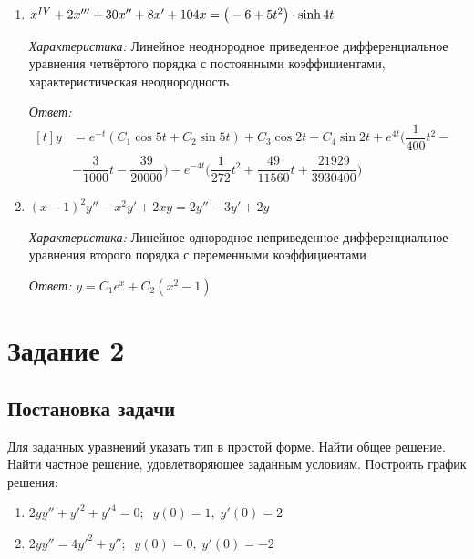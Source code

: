 \documentclass[a4paper, 14pt, fleqn]{extarticle}
\begin{document}
\begin{enumerate}
				\item \(x^{\MakeUppercase{\romannumeral 4}} + 2x''' + 30x'' + 8x' + 104x = \big(-6 + 5t^2\big) \cdot \sinh{4t} \)

					\textit{Характеристика:}  Линейное неоднородное приведенное дифференциальное уравнения четвёртого порядка с постоянными коэффициентами, характеристическая неоднородность
		
					\textit{Ответ:} \(\begin{aligned}[t]  y &= e^{-t}(C_1\cos{5t} + C_2\sin{5t}) + C_3\cos{2t} + C_4\sin{2t} + e^{4t}\bigg(\dfrac{1}{400}t^2 - \\ &-\dfrac{3}{1000}t - \dfrac{39}{20000}\bigg) - e^{-4t}\bigg(\dfrac{1}{272}t^2+\dfrac{49}{11560}t +\dfrac{21929}{3930400}\bigg) \end{aligned}\)
 				\item \((x-1)^2y'' - x^2y' + 2xy = 2y'' -3y' + 2y \)

					\textit{Характеристика:}  Линейное однородное неприведенное дифференциальное уравнения второго порядка с переменными коэффициентами
		
					\textit{Ответ:} \( y = C_1 e^x  + C_2(x^2 - 1) \)

			\end{enumerate}

	\pagebreak
	\section{Задание 2}
		\subsection{Постановка задачи}
			\noindent Для заданных уравнений указать тип в простой форме. Найти общее решение. Найти частное решение, удовлетворяющее заданным условиям. Построить
					график решения:
			\begin{enumerate}
				\item \(2yy'' + y'^2 + y'^4 = 0;\;\; y(0) = 1,\; y'(0) = 2\)
				\item \(2yy'' = 4y'^2 + y'';\;\; y(0) = 0,\; y'(0) = -2\) 
			\end{enumerate}
\end{document}
